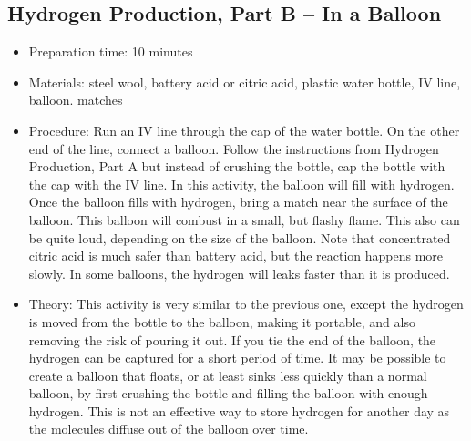 \subsection{Hydrogen Production, Part B -- In a Balloon}
\begin{itemize}
\item{Preparation time: 10 minutes}
\item{Materials: steel wool, battery acid or citric acid, plastic water bottle, IV line, balloon. matches}
\item{Procedure: Run an IV line through the cap of the water bottle. On the other end of the line, connect a balloon. Follow the instructions from Hydrogen Production, Part A but instead of crushing the bottle, cap the bottle with the cap with the IV line. In this activity, the balloon will fill with hydrogen. Once the balloon fills with hydrogen, bring a match near the surface of the balloon. This balloon will combust in a small, but flashy flame. This also can be quite loud, depending on the size of the balloon. Note that concentrated citric acid is much safer than battery acid, but the reaction happens more slowly. In some balloons, the hydrogen will leaks faster than it is produced.}
\item{Theory: This activity is very similar to the previous one, except the hydrogen is moved from the bottle to the balloon, making it portable, and also removing the risk of pouring it out. If you tie the end of the balloon, the hydrogen can be captured for a short period of time. It may be possible to create a balloon that floats, or at least sinks less quickly than a normal balloon, by first crushing the bottle and filling the balloon with enough hydrogen. This is not an effective way to store hydrogen for another day as the molecules diffuse out of the balloon over time.}
\end{itemize}

